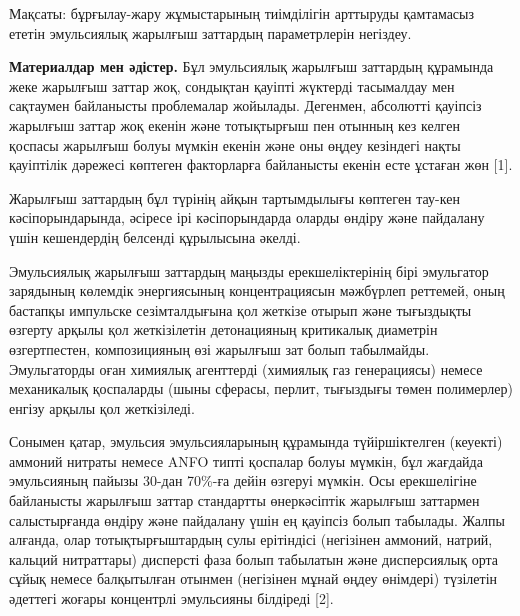 Мақсаты: бұрғылау-жару жұмыстарының тиімділігін арттыруды қамтамасыз
ететін эмульсиялық жарылғыш заттардың параметрлерін негіздеу.

{\bfseries Материалдар мен әдістер.} Бұл эмульсиялық жарылғыш заттардың
құрамында жеке жарылғыш заттар жоқ, сондықтан қауіпті жүктерді
тасымалдау мен сақтаумен байланысты проблемалар жойылады. Дегенмен,
абсолютті қауіпсіз жарылғыш заттар жоқ екенін және тотықтырғыш пен
отынның кез келген қоспасы жарылғыш болуы мүмкін екенін және оны өңдеу
кезіндегі нақты қауіптілік дәрежесі көптеген факторларға байланысты
екенін есте ұстаған жөн {[}1{]}.

Жарылғыш заттардың бұл түрінің айқын тартымдылығы көптеген тау-кен
кәсіпорындарында, әсіресе ірі кәсіпорындарда оларды өндіру және
пайдалану үшін кешендердің белсенді құрылысына әкелді.

Эмульсиялық жарылғыш заттардың маңызды ерекшеліктерінің бірі эмульгатор
зарядының көлемдік энергиясының концентрациясын мәжбүрлеп реттемей, оның
бастапқы импульске сезімталдығына қол жеткізе отырып және тығыздықты
өзгерту арқылы қол жеткізілетін детонацияның критикалық диаметрін
өзгертпестен, композицияның өзі жарылғыш зат болып табылмайды.
Эмульгаторды оған химиялық агенттерді (химиялық газ генерациясы) немесе
механикалық қоспаларды (шыны сферасы, перлит, тығыздығы төмен
полимерлер) енгізу арқылы қол жеткізіледі.

Сонымен қатар, эмульсия эмульсияларының құрамында түйіршіктелген
(кеуекті) аммоний нитраты немесе ANFO типті қоспалар болуы мүмкін, бұл
жағдайда эмульсияның пайызы 30-дан 70\%-ға дейін өзгеруі мүмкін. Осы
ерекшелігіне байланысты жарылғыш заттар стандартты өнеркәсіптік жарылғыш
заттармен салыстырғанда өндіру және пайдалану үшін ең қауіпсіз болып
табылады. Жалпы алғанда, олар тотықтырғыштардың сулы ерітіндісі
(негізінен аммоний, натрий, кальций нитраттары) дисперсті фаза болып
табылатын және дисперсиялық орта сұйық немесе балқытылған отынмен
(негізінен мұнай өңдеу өнімдері) түзілетін әдеттегі жоғары концентрлі
эмульсияны білдіреді {[}2{]}.

